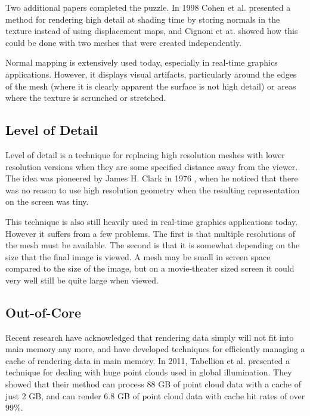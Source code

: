 \documentclass[12pt]{ucthesis}
\begin{document}
Two additional papers completed the puzzle. In 1998 Cohen et al. \cite{cohen:1998}
presented a method for rendering high detail at shading time by storing normals
in the texture instead of using displacement maps, and Cignoni et at. \cite{cignoni:1998}
showed how this could be done with two meshes that were created independently.

Normal mapping is extensively used today, especially in real-time graphics
applications. However, it displays visual artifacts, particularly around the
edges of the mesh (where it is clearly apparent the surface is not high detail)
or areas where the texture is scrunched or stretched.

\subsection{Level of Detail}
\label{levelofdetail}

Level of detail is a technique for replacing high resolution meshes with lower
resolution versions when they are some specified distance away from the viewer.
The idea was pioneered by James H. Clark in 1976 \cite{clark:1976}, when he
noticed that there was no reason to use high resolution geometry when the
resulting representation on the screen was tiny.

This technique is also still heavily used in real-time graphics applications
today. However it suffers from a few problems. The first is that multiple
resolutions of the mesh must be available. The second is that it is somewhat
depending on the size that the final image is viewed. A mesh may be small in
screen space compared to the size of the image, but on a movie-theater sized
screen it could very well still be quite large when viewed.

\subsection{Out-of-Core}
\label{outofcore}

Recent research have acknowledged that rendering data simply will not fit into
main memory any more, and have developed techniques for efficiently managing
a cache of rendering data in main memory. In 2011, Tabellion et al. \cite{tabellion:2011}
presented a technique for dealing with huge point clouds used in global
illumination. They showed that their method can process 88 GB of point cloud
data with a cache of just 2 GB, and can render 6.8 GB of point cloud data with
cache hit rates of over 99\%.
\end{document}
